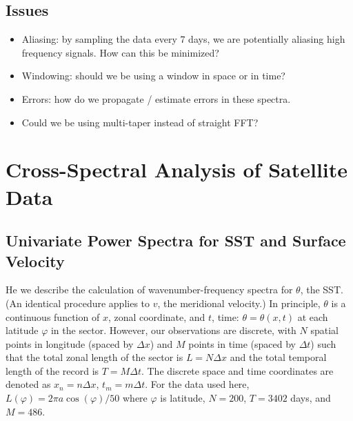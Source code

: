 \documentclass[10pt]{article}
\begin{document}
\subsection{Issues}
\begin{itemize}
\item Aliasing: by sampling the data every 7 days, we are potentially aliasing high frequency signals. How can this be minimized?
\item Windowing: should we be using a window in space or in time?
\item Errors: how do we propagate / estimate errors in these spectra.
\item Could we be using multi-taper instead of straight FFT?
\end{itemize}

\section{Cross-Spectral Analysis of Satellite Data}

\subsection{Univariate Power Spectra for SST and Surface Velocity}

He we describe the calculation of wavenumber-frequency spectra for $\theta$, the SST. (An identical procedure applies to $v$, the meridional velocity.) In principle, $\theta$ is a continuous function of $x$, zonal coordinate, and $t$, time: $\theta = \theta(x,t)$ at each latitude $\varphi$ in the sector. However, our observations are discrete, with $N$ spatial points in longitude (spaced by $\Delta x$) and $M$ points in time (spaced by $\Delta t$) such that the total zonal length of the sector is $L = N \Delta x$ and the total temporal length of the record is $T = M \Delta t$. The discrete space and time coordinates are denoted as $x_n = n \Delta x$, $t_m = m \Delta t$. For the data used here, $L(\varphi) = 2 \pi a \cos(\varphi) / 50$ where $\varphi$ is latitude, $N = 200$, $T = 3402$ days, and $M = 486$.
\end{document}
